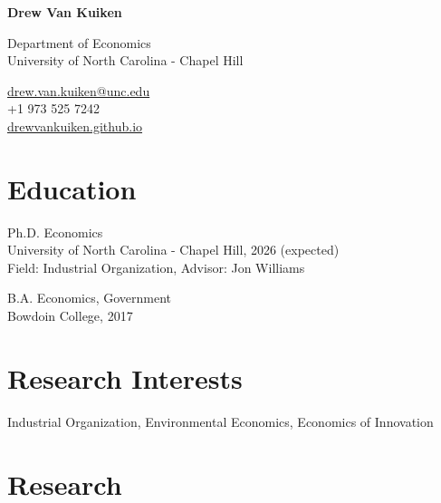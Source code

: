\documentclass[12pt,letterpaper]{report}
\newcommand{\myname}{Drew Van Kuiken}
\newcommand{\namefont}[1]{{\normalfont\bfseries\Huge{#1}}}
\newcommand{\listitemspace}{0.25em}
\renewenvironment{itemize}
{\begin{list}{}{\setlength{\leftmargin}{0em}
			\setlength{\parskip}{0em}
			\setlength{\itemsep}{\listitemspace}
			\setlength{\parsep}{\listitemspace}}}
	{\end{list}}
\begin{document}
	\raggedright{}
	
	\namefont{\myname}
	
	\vspace{1em}
	\begin{minipage}[t]{0.700\textwidth}
		Department of Economics \\
		University of North Carolina - Chapel Hill
	\end{minipage}
	\begin{minipage}[t]{0.295\textwidth}
		\flushright{}
		\href{mailto:drew.van.kuiken@unc.edu}{drew.van.kuiken@unc.edu} \\
		+1 973 525 7242 \\
		\href{https://drewvankuiken.github.io}{drewvankuiken.github.io}
	\end{minipage}
	
	
	\section*{Education}
	
	\begin{tablist}
		
		\item[Ph.D.] \tab{}Economics \\
		University of North Carolina - Chapel Hill, 2026 (expected) \\
		Field: Industrial Organization, Advisor: Jon Williams
		\item[B.A.]  \tab{}Economics, Government \\
		Bowdoin College, 2017
		
	\end{tablist}
		
	\section*{Research Interests}
	
	\begin{itemize}
		
		\item Industrial Organization, Environmental Economics, Economics of Innovation 
		
	\end{itemize}

    \section*{Research}
\end{document}
